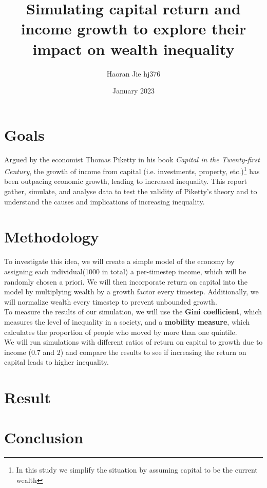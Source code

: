 \documentclass{article}
\title{Simulating capital return and income growth to explore their impact on wealth inequality
}
\author{Haoran Jie hj376}
\date{January 2023}
\begin{document}
\maketitle


\section*{Goals}
Argued by the economist Thomas Piketty in his book \textit{Capital in the Twenty-first Century}, the growth of income from capital (i.e. investments, property, etc.)\footnote{In this study we simplify the situation by assuming capital to be the current wealth} has been outpacing economic growth, leading to increased inequality. This report gather, simulate, and analyse data to test the validity of Piketty's theory and to understand the causes and implications of increasing inequality.

\section*{Methodology}
To investigate this idea, we will create a simple model of the economy by assigning each individual(1000 in total) a per-timestep income, 
which will be randomly chosen a priori. We will then incorporate return on capital into the model by multiplying wealth by a growth factor every timestep.
Additionally, we will normalize wealth every timestep to prevent unbounded growth.\\
To measure the results of our simulation, we will use the \textbf{Gini coefficient}, which measures the level of inequality in a society, 
and a \textbf{mobility measure}, which calculates the proportion of people who moved by more than one quintile.\\
We will run simulations with different ratios of return on capital to growth due to income (0.7 and 2) and compare the results to see if increasing the return on capital leads to higher inequality.






\section*{Result}


\section*{Conclusion}
\end{document}
